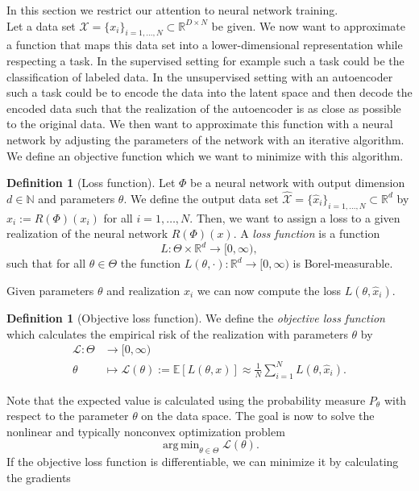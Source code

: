\documentclass[11pt,titlepage]{article}
\newcommand{\R}{\mathbb{R}} %
\newcommand{\N}{\mathbb{N}} %
\newcommand{\E}{\mathbb{E}} %
\DeclareMathOperator*{\argmin}{arg\,min}
\theoremstyle{definition}
\newtheorem{definition}[theorem]{Definition}
\theoremstyle{remark}
\begin{document}
	In this section we restrict our attention to neural network training. \\
	Let a data set $\mathcal{X} = \{x_i\}_{i=1,\ldots,N}\subset\R^{D\times N}$ be given. We now want to approximate a function that maps this data set into a lower-dimensional representation while respecting a task. In the supervised setting for example such a task could be the classification of labeled data. In 
	the unsupervised setting with an autoencoder such a task could be to encode the data into the latent space and then decode the encoded data such that the realization of the autoencoder is as close as possible to the original data.
	We then want to approximate this function with a neural network by adjusting the parameters of the network with an iterative algorithm. We define an objective function which we want to minimize with this algorithm.
	\begin{definition}[Loss function]
		Let $\Phi$ be a neural network with output dimension $d\in\N$ and parameters $\theta$. We define the output data set $\hat{\mathcal{X}} = \{\hat{x}_i\}_{i=1,\ldots,N}\subset \R^d$ 
		by $\hat{x}_i := R(\Phi)(x_i)$ for all $i=1,\ldots,N$. Then, we want to assign a loss to a given realization of the neural network $R(\Phi)(x)$. A \textsl{loss function} is a function
		\[L:\Theta\times\R^d\to[0,\infty),\]
		such that for all $\theta\in\Theta$ the function $L(\theta,\cdot):\R^d \to [0,\infty)$ 
		is Borel-measurable.
	\end{definition}
	Given parameters $\theta$ and realization $\hat{x}_i$ we can now 
	compute the loss $L(\theta, \hat{x}_i)$.
	\begin{definition}[Objective loss function]
		We define the \textsl{objective loss function} which calculates 
		the empirical risk of the realization with parameters $\theta$ by
		\begin{align*}
			\mathcal{L}:\Theta&\to [0,\infty) \\
			\theta&\mapsto \mathcal{L}(\theta) := \E[L(\theta, x)] \approx \frac{1}{N} \sum_{i=1}^N L(\theta, \hat{x}_i).
		\end{align*}
	\end{definition}
	Note that the expected value is calculated using the probability measure $P_\theta$ 
	with respect to the parameter $\theta$ on the data space. The goal is now to solve the nonlinear and 
	typically nonconvex optimization problem
	\[\argmin_{\theta\in\Theta} \mathcal{L}(\theta).\]
	If the objective loss function is differentiable, we can minimize it by calculating the gradients
\end{document}
